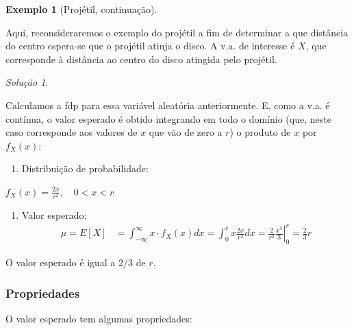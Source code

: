 \documentclass[
]{book}
\providecommand{\tightlist}{%
  \setlength{\itemsep}{0pt}\setlength{\parskip}{0pt}}
\theoremstyle{definition}
\theoremstyle{definition}
\newtheorem{example}{Exemplo}[chapter]
\theoremstyle{definition}
\theoremstyle{remark}
\newtheorem*{solution}{Solução}
\begin{document}
\begin{example}[Projétil, continuação]
\protect\hypertarget{exm:unnamed-chunk-17}{}{\label{exm:unnamed-chunk-17} {} }
\end{example}

Aqui, reconsideraremos o exemplo do projétil a fim de determinar a que distância do centro espera-se que o projétil atinja o disco. A v.a. de interesse é \(X\), que corresponde à distância ao centro do disco atingida pelo projétil.

\begin{solution}
{}
\end{solution}

Calculamos a fdp para essa variável aleatória anteriormente. E, como a v.a. é contínua, o valor esperado é obtido integrando em todo o domínio (que, neste caso corresponde aos valores de \(x\) que vão de zero a \(r\)) o produto de \(x\) por \(f_X(x)\):

\begin{enumerate}
\def\labelenumi{\roman{enumi}.}
\tightlist
\item
  Distribuição de probabilidade:
\end{enumerate}

\({f_X(x) = \frac{2x}{r^2}, \quad 0 < x < r}\)

\begin{enumerate}
\def\labelenumi{\roman{enumi}.}
\setcounter{enumi}{1}
\tightlist
\item
  Valor esperado:
  \begin{align*}
  \mu = {E[X]} &= {\int_{-\infty}^{\infty} x \cdot f_X(x) dx}
  = {\int_{0}^{r} x \frac{2x}{r^2} dx} = {\left.\frac{2}{r^2}\frac{x^3}{3}\right|_{0}^{r}}
  = {\frac{2}{3}r}
  \end{align*}
\end{enumerate}

O valor esperado é igual a 2/3 de \(r\).

\hypertarget{propriedades-2}{%
\subsubsection*{Propriedades}\label{propriedades-2}}

O valor esperado tem algumas propriedades:
\end{document}
